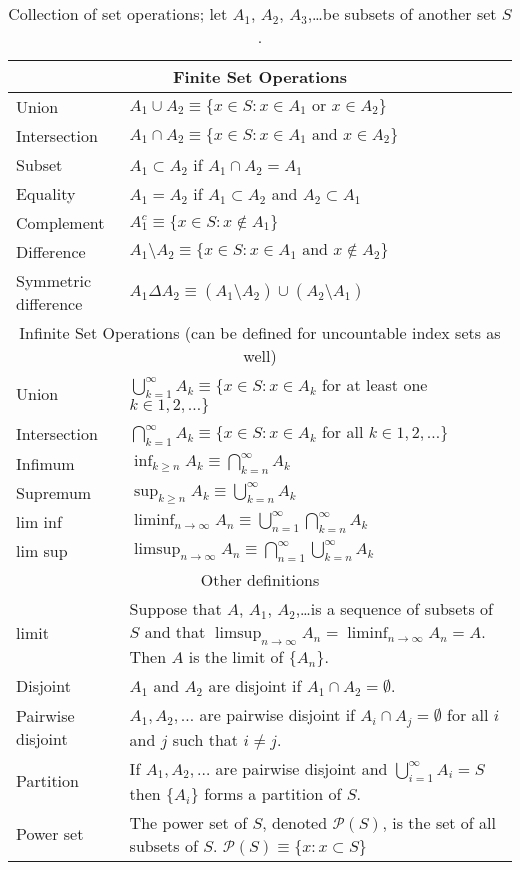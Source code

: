 \begin{itemize}[leftmargin=0pt]
\begin{table*}[t]
\begin{tabular}{lp{4in}}
  \toprule
  \multicolumn{2}{c}{Finite Set Operations} \\
  \midrule
  Union        & $A_1 \cup A_2 \equiv \{x \in S : x \in A_1 \text{ or } x\in A_2\}$ \\
  Intersection & $A_1 \cap A_2 \equiv \{x \in S : x \in A_1 \text{ and } x \in A_2\}$ \\
  Subset       & $A_1 \subset A_2$ if $A_1 \cap A_2 = A_1$ \\
  Equality     & $A_1 = A_2$ if $A_1 \subset A_2$ and $A_2 \subset A_1$ \\
  Complement   & $A_1^c \equiv \{x \in S : x \notin A_1\}$ \\
  Difference   & $A_1 \setminus A_2 \equiv \{x \in S : x \in A_1 \text{ and } x \notin A_2\}$ \\
  Symmetric difference & $A_1 \Delta A_2 \equiv (A_1 \setminus A_2) \cup (A_2 \setminus A_1)$ \\
  \midrule
  \multicolumn{2}{c}{Infinite Set Operations (can be defined for uncountable index sets as well)} \\
  \midrule
  Union        & $\bigcup_{k=1}^\infty A_k \equiv \{x \in S : x \in A_k$ for at least one $k \in 1,2,\dots\}$ \\
  Intersection & $\bigcap_{k=1}^\infty A_k \equiv \{x \in S : x \in A_k$ for all $k \in 1,2,\dots\}$ \\
  Infimum      & $\inf_{k \geq n} A_k \equiv \bigcap_{k=n}^\infty A_k$ \\
  Supremum     & $\sup_{k \geq n} A_k \equiv \bigcup_{k=n}^\infty A_k$ \\
  lim inf      & $\liminf_{n \to \infty} A_n \equiv \bigcup_{n=1}^\infty \bigcap_{k=n}^\infty A_k$ \\
  lim sup      & $\limsup_{n \to \infty} A_n \equiv \bigcap_{n=1}^\infty \bigcup_{k=n}^\infty A_k$ \\
  \midrule
  \multicolumn{2}{c}{Other definitions} \\
  \midrule
  limit 
  & Suppose that $A$, $A_1$, $A_2$,\dots is a sequence of subsets of $S$ and that $\limsup_{n \to \infty} A_n = \liminf_{n \to \infty} A_n = A$.
  Then $A$ is the limit of $\{A_n\}$. \\
  Disjoint 
  & $A_1$ and $A_2$ are disjoint if $A_1 \cap A_2 = \emptyset$. \\
  Pairwise disjoint 
  & $A_1, A_2, \dots$ are pairwise disjoint if $A_i \cap A_j = \emptyset$ for all $i$ and $j$ such that $i \neq j$. \\
  Partition & If $A_1,A_2,\dots$ are pairwise disjoint and $\bigcup_{i=1}^\infty A_i = S$ then $\{A_i\}$ forms a partition of $S$. \\
  Power set & The power set of $S$, denoted $\mathcal{P}(S)$, is the set of all subsets of $S$.
  $\mathcal{P}(S) \equiv \{x : x \subset S\}$ \\
\bottomrule
\end{tabular}
  \caption{Collection of set operations; let $A_1$, $A_2$, $A_3$,\dots be subsets of another set $S$.}
  \label{tab:1}
\end{table*}


\end{itemize}

